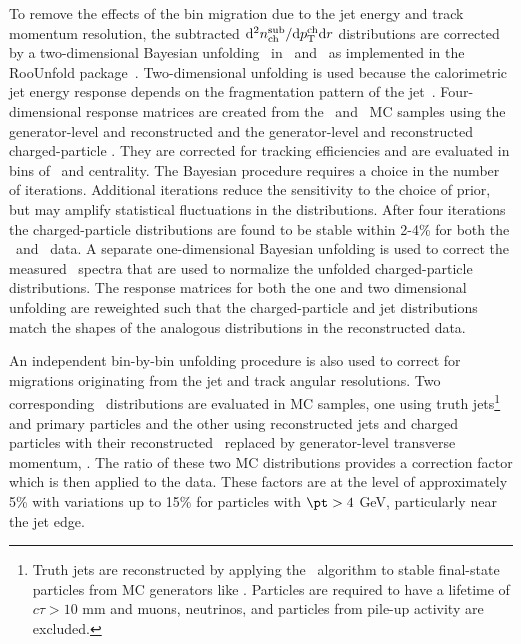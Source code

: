 
To remove the effects of the bin migration due to the jet energy and track momentum resolution, the subtracted $\mathrm{d}^2 \mbox{$n_{\mathrm{ch}}^{\mathrm{sub}}$} /\mathrm{d}\mbox{$p_{\mathrm{T}}^{\mathrm{ch}}$} \mathrm{d} r$ distributions are corrected by a two-dimensional Bayesian unfolding~\cite{DAgostini:1994zf} in \pttrk\ and \ptjet\ as implemented in the RooUnfold package~\cite{Adye:2011gm}.
Two-dimensional unfolding is used because the calorimetric jet energy response depends on the fragmentation pattern of the jet~\cite{Aad:2011he}.
Four-dimensional response matrices are created from the \pp\ and \pbpb\ MC samples using the generator-level and reconstructed \ptjet and the generator-level and reconstructed charged-particle \pttrk.
They are corrected for tracking efficiencies and are evaluated in bins of \rvar\ and centrality.
The Bayesian procedure requires a choice in the number of iterations.
Additional iterations reduce the sensitivity to the choice of prior, but may amplify statistical fluctuations in the distributions.
After four iterations the charged-particle distributions are found to be stable within 2-4\% for both the \PbPb\ and \pp\ data.
A separate one-dimensional Bayesian unfolding is used to correct the measured \ptjet\ spectra that are used to normalize the unfolded charged-particle distributions.
The response matrices for both the one and two dimensional unfolding are reweighted such that the charged-particle and jet distributions match the shapes of the analogous distributions in the reconstructed data.

An independent bin-by-bin unfolding procedure is also used to correct for migrations originating from the jet and track angular resolutions.
Two corresponding \Dptr\ distributions are evaluated in MC samples, one using truth jets\footnote{Truth jets are reconstructed by applying the \antikt\ algorithm to stable final-state particles from MC generators like \PYTHIA.
Particles are required to have a lifetime of $c\tau > 10$ mm and muons, neutrinos, and particles from pile-up activity are excluded.}
and primary particles and the other using reconstructed jets and charged particles with their reconstructed \pt\ replaced by generator-level transverse momentum, \pTtrue.
The ratio of these two MC distributions provides a correction factor which is then applied to the data.
These factors are at the level of approximately 5\% with variations up to 15\% for particles with $\pt > 4$ GeV, particularly near the jet edge.


